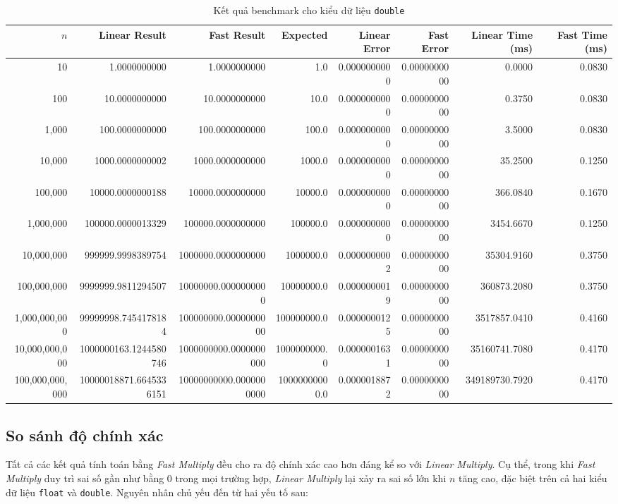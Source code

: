 \begin{landscape}
\begin{table}
    \centering
    \caption{Kết quả benchmark cho kiểu dữ liệu \texttt{double}}
    \small %
    \begin{tabular}{r r r r r r r r}
        \toprule
        $n$ & Linear Result & Fast Result & Expected & Linear Error & Fast Error & Linear Time (ms) & Fast Time (ms) \\
        \midrule
        10 & 1.0000000000 & 1.0000000000 & 1.0 & 0.0000000000 & 0.0000000000 & 0.0000 & 0.0830 \\
        100 & 10.0000000000 & 10.0000000000 & 10.0 & 0.0000000000 & 0.0000000000 & 0.3750 & 0.0830 \\
        1,000 & 100.0000000000 & 100.0000000000 & 100.0 & 0.0000000000 & 0.0000000000 & 3.5000 & 0.0830 \\
        10,000 & 1000.0000000002 & 1000.0000000000 & 1000.0 & 0.0000000000 & 0.0000000000 & 35.2500 & 0.1250 \\
        100,000 & 10000.0000000188 & 10000.0000000000 & 10000.0 & 0.0000000000 & 0.0000000000 & 366.0840 & 0.1670 \\
        1,000,000 & 100000.0000013329 & 100000.0000000000 & 100000.0 & 0.0000000000 & 0.0000000000 & 3454.6670 & 0.1250 \\
        10,000,000 & 999999.9998389754 & 1000000.0000000000 & 1000000.0 & 0.0000000002 & 0.0000000000 & 35304.9160 & 0.3750 \\
        100,000,000 & 9999999.9811294507 & 10000000.0000000000 & 10000000.0 & 0.0000000019 & 0.0000000000 & 360873.2080 & 0.3750 \\
        1,000,000,000 & 99999998.7454178184 & 100000000.0000000000 & 100000000.0 & 0.0000000125 & 0.0000000000 & 3517857.0410 & 0.4160 \\
        10,000,000,000 & 1000000163.1244580746 & 1000000000.0000000000 & 1000000000.0 & 0.0000001631 & 0.0000000000 & 35160741.7080 & 0.4170 \\
        100,000,000,000 & 10000018871.6645336151 & 10000000000.0000000000 & 10000000000.0 & 0.0000018872 & 0.0000000000 & 349189730.7920 & 0.4170 \\
        \bottomrule
    \end{tabular}
\end{table}
\end{landscape}

\subsection{So sánh độ chính xác}
Tất cả các kết quả tính toán bằng \textit{Fast Multiply} đều cho ra độ chính xác cao hơn đáng kể so với \textit{Linear Multiply}. Cụ thể, trong khi \textit{Fast Multiply} duy trì sai số gần như bằng 0 trong mọi trường hợp, \textit{Linear Multiply} lại xảy ra sai số lớn khi $n$ tăng cao, đặc biệt trên cả hai kiểu dữ liệu \texttt{float} và \texttt{double}. Nguyên nhân chủ yếu đến từ hai yếu tố sau:

